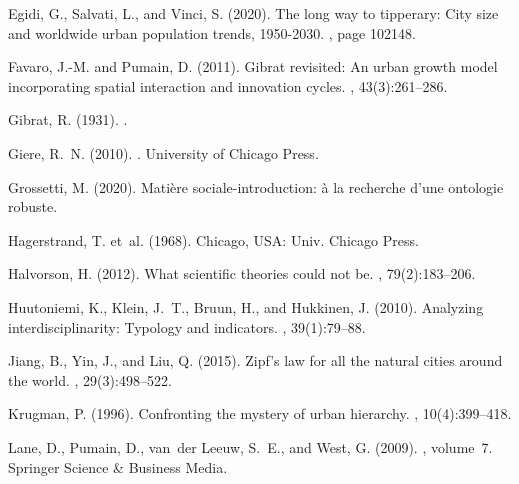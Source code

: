 \documentclass[10pt]{article}
\begin{document}
\begin{thebibliography}{}
Egidi, G., Salvati, L., and Vinci, S. (2020).
\newblock The long way to tipperary: City size and worldwide urban population
  trends, 1950-2030.
, page 102148.

Favaro, J.-M. and Pumain, D. (2011).
\newblock Gibrat revisited: An urban growth model incorporating spatial
  interaction and innovation cycles.
, 43(3):261--286.

Gibrat, R. (1931).
.

Giere, R.~N. (2010).
.
\newblock University of Chicago Press.

Grossetti, M. (2020).
\newblock Mati{\`e}re sociale-introduction: {\`a} la recherche d'une ontologie
  robuste.

Hagerstrand, T. et~al. (1968).
\newblock Chicago, USA: Univ. Chicago Press.

Halvorson, H. (2012).
\newblock What scientific theories could not be.
, 79(2):183--206.

Huutoniemi, K., Klein, J.~T., Bruun, H., and Hukkinen, J. (2010).
\newblock Analyzing interdisciplinarity: Typology and indicators.
, 39(1):79--88.

Jiang, B., Yin, J., and Liu, Q. (2015).
\newblock Zipf’s law for all the natural cities around the world.
,
  29(3):498--522.

Krugman, P. (1996).
\newblock Confronting the mystery of urban hierarchy.
,
  10(4):399--418.

Lane, D., Pumain, D., van~der Leeuw, S.~E., and West, G. (2009).
,
  volume~7.
\newblock Springer Science \& Business Media.


\end{thebibliography}
\end{document}
